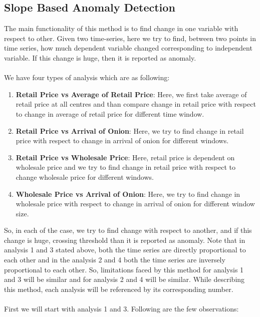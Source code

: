 \subsection{Slope Based Anomaly Detection}
	
		The main functionality of this method is to find change in one variable with respect to other. Given two time-series, here we try to find, between two points in time series, how much dependent variable changed corresponding to independent variable. If this change is huge, then it is reported as anomaly.\\
		\\
		We have four types of analysis which are as following:
		\begin{enumerate}
			\item \textbf{Retail Price vs Average of Retail Price}: Here, we first take average of retail price at all centres and than compare change in retail price with respect to change in average of retail price for different time window.			
			\item \textbf{Retail Price vs Arrival of Onion}: Here, we try to find change in retail price with respect to change in arrival of onion for different windows. 
			\item \textbf{Retail Price vs Wholesale Price}: Here, retail price is dependent on wholesale price and we try to find change in retail price with respect to change wholesale price for different windows.
			\item \textbf{Wholesale Price vs Arrival of Onion}: Here, we try to find change in wholesale price with respect to change in arrival of onion for different window size.
		\end{enumerate}
		
		So, in each of the case, we try to find change with respect to another, and if this change is huge, crossing threshold than it is reported as anomaly. Note that in analysis 1 and 3 stated above, both the time series are directly proportional to each other and in the analysis 2 and 4 both the time series are inversely proportional to each other. So, limitations faced by this method for analysis 1 and 3 will be similar and for analysis 2 and 4 will be similar. While describing this method, each analysis will be referenced by its corresponding number.\\
		\\
		First we will start with analysis 1 and 3. Following are the few observations:
		
